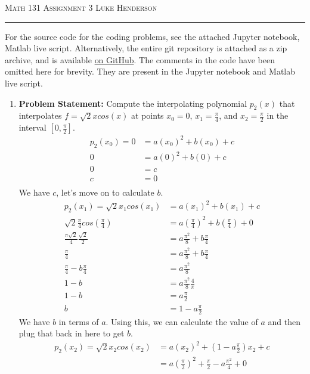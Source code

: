 \documentclass[12pt]{amsart}
\begin{document}
{\scshape Math 131} \hfill {\scshape \large Assignment 3} \hfill {\scshape Luke Henderson}
\smallskip
\hrule
\bigskip

For the source code for the coding problems, see the attached Jupyter notebook, Matlab live script. Alternatively, the entire git repository  is attached as a zip archive, and is available \href{https://github.com/blackHat-Magic/math-131-HW3}{on GitHub}. The comments in the code have been omitted here for brevity. They are present in the Jupyter notebook and Matlab live script.

\begin{enumerate}
    \item \textbf{Problem Statement:} Compute the interpolating polynomial $p_2(x)$ that interpolates $f = \sqrt{2}xcos(x)$ at points $x_0 = 0$, $x_1 = \frac{\pi}{4}$, and $x_2 = \frac{\pi}{2}$ in the interval $[0, \frac{\pi}{2}]$.
    \begin{align*}
        p_2(x_0) = 0 & = a(x_0)^2 + b(x_0) + c \\
        0 & = a(0)^2 + b(0) + c \\
        0 & = c \\
        c & = 0 \\
    \end{align*}
    We have $c$, let's move on to calculate $b$.
    \begin{align*}
        p_2(x_1) = \sqrt{2}x_1cos(x_1) & = a(x_1)^2 + b(x_1) + c \\
        \sqrt{2}\frac{\pi}{4}cos\left(\frac{\pi}{4}\right) & = a\left(\frac{\pi}{4}\right)^2 + b\left(\frac{\pi}{4}\right) + 0 \\
        \frac{\pi\sqrt{2}}{4}\frac{\sqrt{2}}{2} & = a\frac{\pi^2}{8} + b\frac{\pi}{4} \\
        \frac{\pi}{4} & = a\frac{\pi^2}{8} + b\frac{\pi}{4} \\
        \frac{\pi}{4} - b\frac{\pi}{4} & = a\frac{\pi^2}{8} \\
        1 - b & = a\frac{\pi^2}{8}\frac{4}{\pi} \\
        1 - b & = a\frac{\pi}{2} \\
        b & = 1 - a\frac{\pi}{2}
    \end{align*}
    We have $b$ in terms of $a$. Using this, we can calculate the value of $a$ and then plug that back in here to get $b$.
    \begin{align*}
        p_2(x_2) = \sqrt{2}x_2cos(x_2) & = a(x_2)^2 + (1 - a\frac{\pi}{2})x_2 + c \\
        & = a(\frac{\pi}{2})^2 + \frac{\pi}{2} - a\frac{\pi^2}{4} + 0 \\
    \end{align*}
\end{enumerate}
\end{document}
